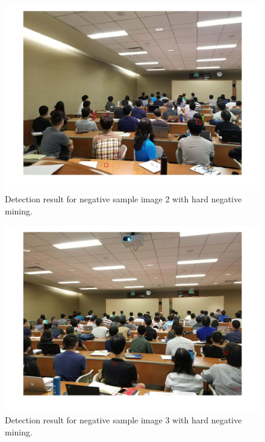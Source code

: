 \documentclass[10pt]{article}
\begin{document}
	\newpage\begin{figure}[ht]
		\includegraphics[width=\textwidth]{detection_nonface_2_hard_neg.jpg}
		\centering
		\caption{Detection result for negative sample image 2 with hard negative mining.}
		\label{18}
	\end{figure}
	\newpage\begin{figure}[ht]
		\includegraphics[width=\textwidth]{detection_nonface_3_hard_neg.jpg}
		\centering
		\caption{Detection result for negative sample image 3 with hard negative mining.}
		\label{19}
	\end{figure}
\end{document}
